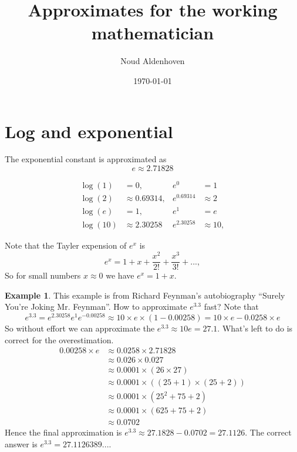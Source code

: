 \documentclass[10pt]{article}
\theoremstyle{definition}
\newtheorem{example}{Example}[section]
\begin{document}
\title{Approximates for the working mathematician}
\author{Noud Aldenhoven}
\date{\today}
\maketitle

\section{Log and exponential}

The exponential constant is approximated as
\begin{equation*}
    e \approx 2.71828
\end{equation*}

\begin{align*}
    \log(1) &= 0,               & e^0 &= 1 \\
    \log(2) &\approx 0.69314,   & e^{0.69314} &\approx 2 \\
    \log(e) &= 1,               & e^{1} &= e \\
    \log(10) &\approx 2.30258   & e^{2.30258} &\approx 10,
\end{align*}

Note that the Tayler expension of $e^x$ is
\begin{equation*}
    e^x = 1 + x + \frac{x^2}{2!} + \frac{x^3}{3!} + ...,
\end{equation*}
So for small numbers $x \approx 0$ we have $e^x = 1 + x$.

\begin{example}
    This example is from Richard Feynman's autobiography ``Surely You're Joking Mr. Feynman''.
    How to approximate $e^{3.3}$ fast?
    Note that
    \begin{equation*}
        e^{3.3} = e^{2.30258} e^{1} e^{-0.00258}
            \approx 10 \times e \times (1 - 0.00258)
            = 10 \times e - 0.0258 \times e
    \end{equation*}
    So without effort we can approximate the $e^{3.3} \approx 10 e = 27.1$.
    What's left to do is correct for the overestimation.
    \begin{equation*}
        \begin{split}
            0.00258 \times e
                &\approx 0.0258 \times 2.71828 \\
                &\approx 0.026 \times 0.027 \\
                &\approx 0.0001 \times (26 \times 27) \\
                &\approx 0.0001 \times ((25 + 1) \times (25 + 2)) \\
                &\approx 0.0001 \times (25^2 + 75 + 2) \\
                &\approx 0.0001 \times (625 + 75 + 2) \\
                &\approx 0.0702
        \end{split}
    \end{equation*}
    Hence the final approximation is $e^{3.3} \approx 27.1828 - 0.0702 = 27.1126$.
    The correct answer is $e^{3.3} = 27.1126389...$.
\end{example}
\end{document}
